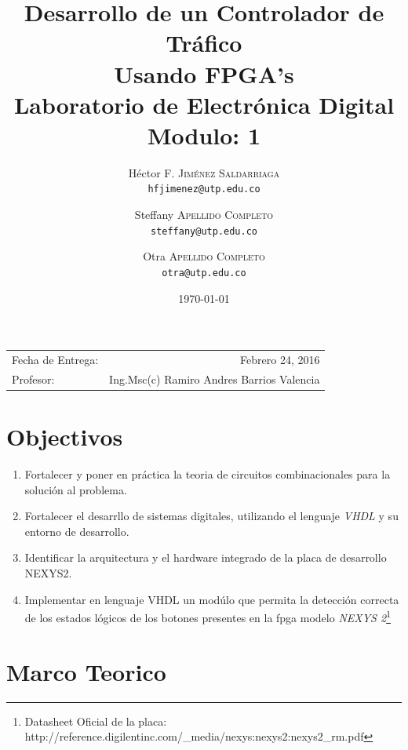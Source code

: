 \documentclass{article}
\title{Desarrollo de un Controlador de Tráfico\\ Usando FPGA's \\ Laboratorio de Electrónica Digital\\Modulo: 1} %
\author{
Héctor F. \textsc{Jiménez Saldarriaga}\\
\texttt{hfjimenez@utp.edu.co}
\and
Steffany \textsc{Apellido Completo}\\
\texttt{steffany@utp.edu.co}
\and
Otra \textsc{Apellido Completo}\\
\texttt{otra@utp.edu.co}
}        %
\date{\today}                           %
\begin{document}
\maketitle                              %
\begin{center}
\begin{tabular}{l r}
Fecha de Entrega: & Febrero 24, 2016 \\
Profesor: & Ing.Msc(c) Ramiro Andres Barrios Valencia
\end{tabular}
\end{center}

\section{Objectivos}
\begin{enumerate}
  \item Fortalecer y poner en práctica la teoria de circuitos combinacionales para la solución al problema.
  \item Fortalecer el desarrllo de sistemas digitales, utilizando el lenguaje \emph{VHDL} y su entorno de desarrollo.
  \item Identificar la arquitectura y el hardware integrado de la placa de desarrollo NEXYS2.
  \item Implementar en lenguaje VHDL un modúlo que permita la detección correcta de los estados lógicos de los botones presentes en la fpga modelo \emph{NEXYS 2}\footnote{Datasheet Oficial de la placa: http://reference.digilentinc.com/_media/nexys:nexys2:nexys2_rm.pdf}
\end{enumerate}


\section{Marco Teorico}
\end{document}
